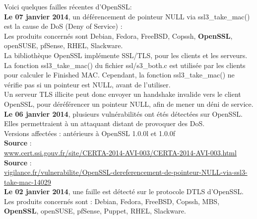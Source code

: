 \documentclass{article}
\begin{document}
	Voici quelques failles récentes d'OpenSSL:\\
	
	\textbf{Le 07 janvier 2014}, un déférencement de pointeur NULL via ssl3\_take\_mac() 
	est la cause de DoS (Deny of Service) : \\
	
	Les produits concernés sont Debian, Fedora, FreeBSD, Copssh, \textbf{OpenSSL}, 
	openSUSE, pfSense, RHEL, Slackware.\\
	
	La bibliothèque OpenSSL implémente SSL/TLS, pour les clients et les serveurs.\\

	La fonction ssl3\_take\_mac() du fichier ssl/s3\_both.c est utilisée par les clients 
	pour calculer le Finished MAC. Cependant, la fonction ssl3\_take\_mac() ne vérifie 
	pas si un pointeur est NULL, avant de l'utiliser.\\

	Un serveur TLS illicite peut donc envoyer un handshake invalide vers le client 
	OpenSSL, pour déréférencer un pointeur NULL, afin de mener un déni de service.\\

	\textbf{Le 06 janvier 2014}, plusieurs vulnérabilités ont étés détectées sur OpenSSL.	
	Elles permettraient à un attaquant distant de provoquer des DoS.\\
	
	Versions affectées : antérieurs à OpenSSL 1.0.0l et 1.0.0f\\
	
	\textbf{Source} :\\ 
	\href{http://www.cert.ssi.gouv.fr/site/CERTA-2014-AVI-003/CERTA-2014-AVI-003.html}
	{www.cert.ssi.gouv.fr/site/CERTA-2014-AVI-003/CERTA-2014-AVI-003.html}\\

	\textbf{Source} : \\
	\href{http://vigilance.fr/vulnerabilite/OpenSSL-dereferencement-de-pointeur-NULL-via-ssl3-take-mac-14029}
	{vigilance.fr/vulnerabilite/OpenSSL-dereferencement-de-pointeur-NULL-via-ssl3-take-mac-14029}\\
	
	\textbf{Le 02 janvier 2014}, une faille est détecté sur le protocole DTLS d'OpenSSL. \\
	Les produits concernés sont : Debian, Fedora, FreeBSD, Copssh, MBS, 
	\textbf{OpenSSL}, openSUSE, pfSense, Puppet, RHEL, Slackware.\\
\end{document}
